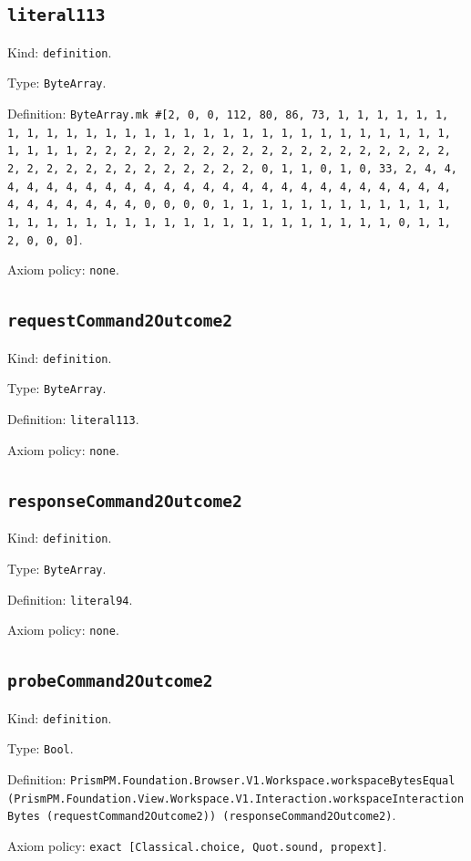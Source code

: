 \documentclass[11pt]{article}
\begin{document}
\subsection*{\texttt{literal113}}
\noindent Kind: \texttt{definition}.\par
\noindent Type: \texttt{ByteArray}.\par
\noindent Definition: \texttt{ByteArray.mk \#[2, 0, 0, 112, 80, 86, 73, 1, 1, 1, 1, 1, 1, 1, 1, 1, 1, 1, 1, 1, 1, 1, 1, 1, 1, 1, 1, 1, 1, 1, 1, 1, 1, 1, 1, 1, 1, 1, 1, 1, 2, 2, 2, 2, 2, 2, 2, 2, 2, 2, 2, 2, 2, 2, 2, 2, 2, 2, 2, 2, 2, 2, 2, 2, 2, 2, 2, 2, 2, 2, 2, 2, 0, 1, 1, 0, 1, 0, 33, 2, 4, 4, 4, 4, 4, 4, 4, 4, 4, 4, 4, 4, 4, 4, 4, 4, 4, 4, 4, 4, 4, 4, 4, 4, 4, 4, 4, 4, 4, 4, 4, 4, 0, 0, 0, 0, 1, 1, 1, 1, 1, 1, 1, 1, 1, 1, 1, 1, 1, 1, 1, 1, 1, 1, 1, 1, 1, 1, 1, 1, 1, 1, 1, 1, 1, 1, 1, 1, 0, 1, 1, 2, 0, 0, 0]}.\par
\noindent Axiom policy: \texttt{none}.\par
\subsection*{\texttt{requestCommand2Outcome2}}
\noindent Kind: \texttt{definition}.\par
\noindent Type: \texttt{ByteArray}.\par
\noindent Definition: \texttt{literal113}.\par
\noindent Axiom policy: \texttt{none}.\par
\subsection*{\texttt{responseCommand2Outcome2}}
\noindent Kind: \texttt{definition}.\par
\noindent Type: \texttt{ByteArray}.\par
\noindent Definition: \texttt{literal94}.\par
\noindent Axiom policy: \texttt{none}.\par
\subsection*{\texttt{probeCommand2Outcome2}}
\noindent Kind: \texttt{definition}.\par
\noindent Type: \texttt{Bool}.\par
\noindent Definition: \texttt{PrismPM.Foundation.Browser.V1.Workspace.workspaceBytesEqual (PrismPM.Foundation.View.Workspace.V1.Interaction.workspaceInteractionBytes (requestCommand2Outcome2)) (responseCommand2Outcome2)}.\par
\noindent Axiom policy: \texttt{exact [Classical.choice, Quot.sound, propext]}.\par
\end{document}
